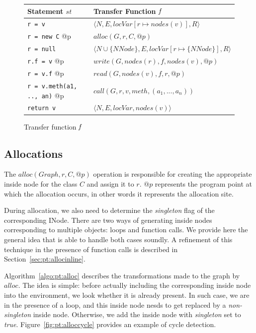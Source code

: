 \begin{figure}[h]
    \centering

    \begin{tabular}{ l | l }
        Statement $st$                & Transfer Function $\emph{f}$\\
        \hline
        \verb/r = v/                     & $\langle N, E, locVar[r \mapsto nodes(v)], R \rangle$ \\
        \verb/r = new C/ @p              & $alloc(G, r, C, @p)$ \\
        \verb/r = null/                  & $\langle N \cup \{NNode\}, E, locVar[r \mapsto \{ NNode \}], R \rangle$ \\
        \verb/r.f = v/ @p                & $write(G, nodes(r), f, nodes(v), @p)$ \\
        \verb/r = v.f/ @p                & $read(G, nodes(v), f, r, @p)$ \\
        \verb/r = v.meth(a1, .., an)/ @p & $call(G, r, v, meth, (a_1, ..., a_n))$ \\
        \verb/return v/                  & $\langle N, E, locVar, nodes(v) \rangle$ \\
    \end{tabular}

    \caption{Transfer function $\emph{f}$}
    \label{fig:pt:tf}
\end{figure}

\subsection{Allocations}
The $alloc(Graph, r, C, @p)$ operation is responsible for creating the
appropriate inside node for the class $C$ and assign it to $r$. $@p$ represents
the program point at which the allocation occurs, in other words it represents
the allocation site.

During allocation, we also need to determine the \emph{singleton} flag of the
corresponding INode. There are two ways of generating inside nodes
corresponding to multiple objects: loops and function calls. We provide here
the general idea that is able to handle both cases soundly. A refinement
of this technique in the presence of function calls is described in
Section~\ref{sec:pt:allocinline}.

Algorithm~\ref{algo:pt:alloc} describes the transformations made to the graph by
$alloc$. The idea is simple: before actually including the corresponding inside
node into the environment, we look whether it is already present. In such case,
we are in the presence of a loop, and this inside node nesds to get replaced by
a \emph{non-singleton} inside node. Otherwise, we add the inside node with
\emph{singleton} set to \emph{true}. Figure~\ref{fig:pt:alloccycle} provides an
example of cycle detection.

